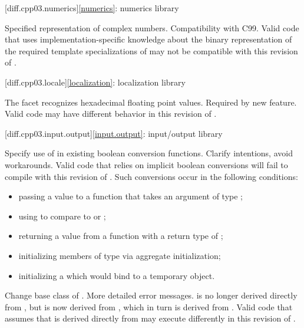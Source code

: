 [diff.cpp03.numerics]{\ref{numerics}: numerics library}

\change
Specified representation of complex numbers.
\rationale
Compatibility with C99.
\effect
Valid \CppIII{} code that uses implementation-specific knowledge about the
binary representation of the required template specializations of
 may not be compatible with this revision of \Cpp{}.

[diff.cpp03.locale]{\ref{localization}: localization library}

\change
The  facet recognizes hexadecimal floating point values.
\rationale
Required by new feature.
\effect
Valid \CppIII{} code may have different behavior in this revision of \Cpp{}.

[diff.cpp03.input.output]{\ref{input.output}: input/output library}

\change
Specify use of  in existing boolean conversion functions.
\rationale
Clarify intentions, avoid workarounds.
\effect
Valid \CppIII{} code that relies on implicit boolean conversions will fail to
compile with this revision of \Cpp{}. Such conversions occur in the
following conditions:

\begin{itemize}
\item passing a value to a function that takes an argument of type ;
\item using  to compare to  or ;
\item returning a value from a function with a return type of ;
\item initializing members of type  via aggregate initialization;
\item initializing a  which would bind to a temporary object.
\end{itemize}

\change
Change base class of .
\rationale
More detailed error messages.
\effect
{} is no longer derived directly from
, but is now derived from ,
which in turn is derived from . Valid \CppIII{} code
that assumes that  is derived directly from
 may execute differently in this revision of \Cpp{}.

